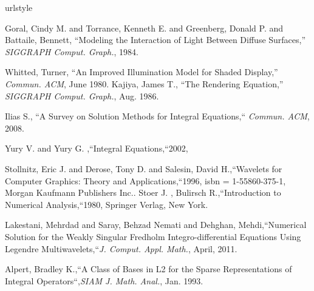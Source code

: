 \begin{thebibliography}{99}
\providecommand{\url}[1]{{#1}}
\providecommand{\urlprefix}{URL }
\expandafter\ifx\csname urlstyle\endcsname\relax
  \providecommand{\doi}[1]{DOI~\discretionary{}{}{}#1}\else
  \providecommand{\doi}{DOI~\discretionary{}{}{}\begingroup
  \urlstyle{rm}\Url}\fi
\fontsize{9 pt}{11.2}\selectfont

Goral, Cindy M. and Torrance, Kenneth E. and Greenberg, Donald P. and Battaile, Bennett, ``Modeling the Interaction of Light Between Diffuse Surfaces,'' \emph{SIGGRAPH Comput. Graph.}, 1984.

Whitted, Turner, ``An Improved Illumination Model for Shaded Display,'' \emph{Commun. ACM}, June 1980.
Kajiya, James T., ``The Rendering Equation,'' \emph{SIGGRAPH Comput. Graph.}, Aug. 1986.




 Ilias S., ``A Survey on Solution Methods for Integral Equations,`` \emph{Commun. ACM}, 2008.

 Yury V. and Yury G. ,``Integral Equations,``2002,



 Stollnitz, Eric J. and Derose, Tony D. and Salesin, David H.,``Wavelets for Computer Graphics: Theory and Applications,``1996, isbn = {1-55860-375-1}, Morgan Kaufmann Publishers Inc..
Stoer J. , Bulirsch R.,``Introduction to Numerical Analysis,``1980, Springer Verlag, New York.

Lakestani, Mehrdad and Saray, Behzad Nemati and Dehghan, Mehdi,``Numerical Solution for the Weakly Singular Fredholm Integro-differential Equations Using Legendre Multiwavelets,``\emph{J. Comput. Appl. Math.}, April, 2011.

Alpert, Bradley K.,``A Class of Bases in L2 for the Sparse Representations of Integral Operators``,\emph{SIAM J. Math. Anal.}, Jan. 1993.




\end{thebibliography}
